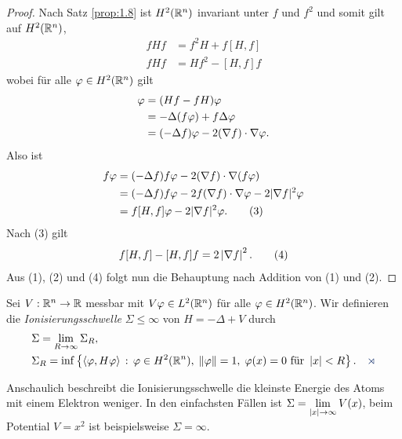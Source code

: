 \begin{proof}
Nach Satz \ref{prop:1.8} ist $H^2(\mathbb{R}^n)$ invariant unter $f$ und $f^2$
und somit gilt auf $H^2(\mathbb{R}^n)$,
\begin{align*}
 fHf &= f^2H+f[H,f]\tag{1}\\
 fHf &= Hf^2-[H,f]f\tag{2}
\end{align*}
wobei für alle $\varphi \in H^2(\mathbb{R}^n)$ gilt
\begin{align*}
[H,f]\ph &= (Hf-fH)\ph\\
  &= -\Delta(f\ph)+f\Delta\ph\\
  &= (-\Delta f)\ph-2(\nabla f)\cdot\nabla\ph.
\end{align*}
Also ist
\begin{align*}
 [H,f]f\ph &= (-\Delta f)f\ph-2(\nabla f)\cdot\nabla(f\ph)\\
    &= (-\Delta f)f\ph-2f(\nabla f)\cdot\nabla\ph-2|\nabla f|^2\ph\\
    &= f[H,f]\ph-2|\nabla f|^2\ph.\tag{3}
\end{align*}
Nach (3) gilt
\begin{align*}
f[H,f] - [H,f]f = 2\left|\nabla f\right|^2.\tag{4} 
\end{align*}
Aus (1), (2) und (4) folgt nun die Behauptung nach Addition von (1) und
(2).\qedhere
\end{proof}

\begin{defn*}
Sei $V:\mathbb{R}^n\to\mathbb{R}$ messbar mit $V\varphi\in L^2(\mathbb{R}^n)$ für alle $\varphi\in H^2(\mathbb{R}^n)$.
Wir definieren die \emph{Ionisierungsschwelle}
$\Sigma\le \infty$ von $H=-\Delta+V$ durch
\begin{align*}
&\Sigma = \lim\limits_{R\to\infty} \Sigma_R,\\
&\Sigma_R = \inf\setdef{\lin{\ph,H\ph}}{\ph\in H^2(\R^n),\; \norm{\ph} = 1,\;
\ph(x) = 0\text{ für } \abs{x}< R}.\fishhere
\end{align*}
\end{defn*}

Anschaulich beschreibt die Ionisierungsschwelle die kleinste
Energie des Atoms mit einem Elektron weniger. In den einfachsten Fällen ist
$\Sigma=\lim\limits_{\left|x\right|\to\infty} V(x)$, beim Potential $V=x^2$ ist
beispielsweise $\Sigma=\infty$.

